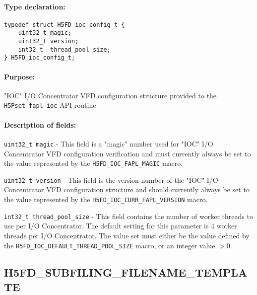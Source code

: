 \documentclass[../main.tex]{subfiles}
\begin{document}
\paragraph{Type declaration:}
\begin{flushleft}%
\begin{verbatim}
typedef struct H5FD_ioc_config_t {
    uint32_t magic;
    uint32_t version;
    int32_t  thread_pool_size;
} H5FD_ioc_config_t;
\end{verbatim}
\end{flushleft}%

\paragraph{Purpose:}
\begin{flushleft}%
"IOC" I/O Concentrator VFD configuration structure provided to the \texttt{H5Pset\_fapl\_ioc}
API routine
\end{flushleft}%

\paragraph{Description of fields:}
\begin{flushleft}%
\texttt{uint32\_t magic} - This field is a "magic" number used for "IOC" I/O Concentrator VFD
configuration verification and must currently always be set to the value represented by the
\texttt{H5FD\_IOC\_FAPL\_MAGIC} macro.

\texttt{uint32\_t version} - This field is the version number of the "IOC" I/O Concentrator VFD
configuration structure and should currently always be set to the value represented by the
\texttt{H5FD\_IOC\_CURR\_FAPL\_VERSION} macro.

\texttt{int32\_t thread\_pool\_size} - This field contains the number of worker threads to
use per I/O Concentrator. The default setting for this parameter is 4 worker threads per I/O
Concentrator. The value set must either be the value defined by the \texttt{H5FD\_IOC\_DEFAULT\_THREAD\_POOL\_SIZE}
macro, or an integer value $> 0$.
\end{flushleft}%

\newpage

\subsection{H5FD\_SUBFILING\_FILENAME\_TEMPLATE}
\label{ref:h5fd_subfiling_filename_template}
\end{document}
